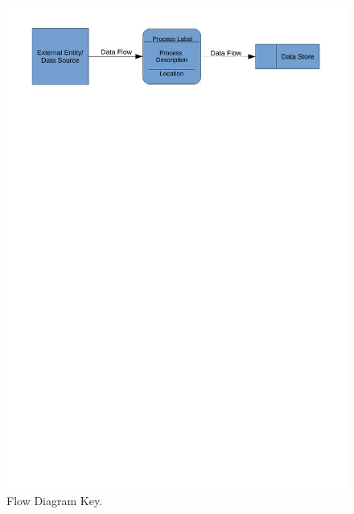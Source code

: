 \begin{figure}[H]
    \includegraphics[width=\textwidth]{./Analysis/Dataflow/DFD_analysis_key.pdf}
    \caption{Flow Diagram Key.} \label{fig:print_function_result}
\end{figure}

